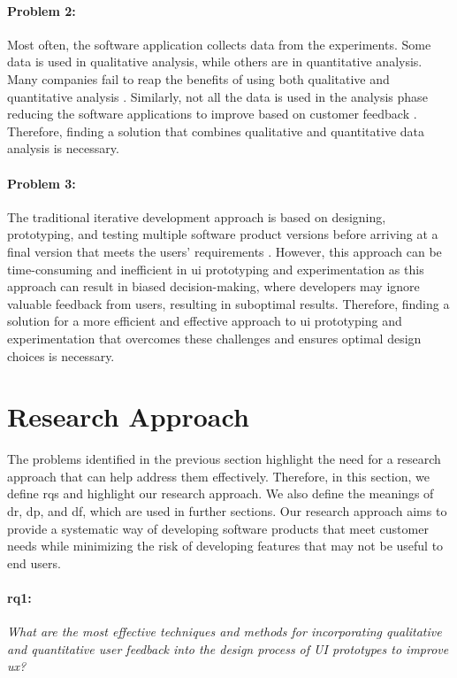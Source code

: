 \paragraph{Problem 2:} Most often, the software application collects data from the experiments. 
Some data is used in qualitative analysis, while others are in quantitative analysis.
Many companies fail to reap the benefits of using both qualitative and quantitative analysis \cite{article:qqa:young}.
Similarly, not all the data is used in the analysis phase reducing the software applications to improve based on customer feedback \cite{article:datadrive:brian}.
Therefore, finding a solution that combines qualitative and quantitative data analysis is necessary.

\paragraph{Problem 3:} 
The traditional iterative development approach is based on designing, prototyping, and testing multiple software product versions before arriving at a final version that meets the users' requirements \cite{article:experiments:lindgren}.
However, this approach can be time-consuming and inefficient in \ac{ui} prototyping and experimentation as this approach can result in biased decision-making, where developers may ignore valuable feedback from users, resulting in suboptimal results.
Therefore, finding a solution for a more efficient and effective approach to \ac{ui} prototyping and experimentation that overcomes these challenges and ensures optimal design choices is necessary.

\clearpage
\section{Research Approach}  %
\label{introduction:section:research}
The problems identified in the previous section highlight the need for a research approach that can help address them effectively.
Therefore, in this section, we define \ac{rq}s and highlight our research approach. 
We also define the meanings of \ac{dr}, \ac{dp}, and \ac{df}, which are used in further sections.
Our research approach aims to provide a systematic way of developing software products that meet customer needs while minimizing the risk of developing features that may not be useful to end users.

\paragraph{\ac{rq}1:} \textit{What are the most effective techniques and methods for incorporating qualitative and quantitative user feedback into the design process of UI prototypes to improve \ac{ux}?}
